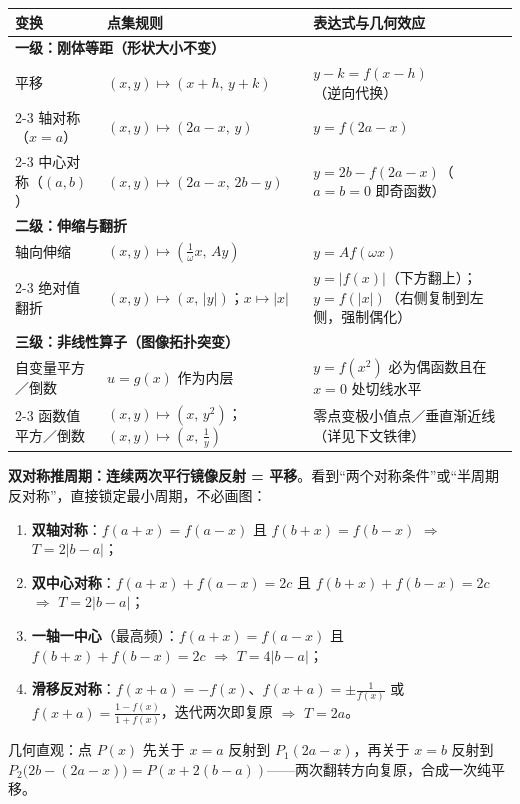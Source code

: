 \begin{explore}
\begin{center}
\renewcommand{\arraystretch}{1.4}
\begin{tabular}{|p{3.2cm}|p{4.0cm}|p{4.8cm}|}
\hline
\textbf{变换} & \textbf{点集规则} & \textbf{表达式与几何效应} \\
\hline
\multicolumn{3}{|l|}{\textbf{一级：刚体等距（形状大小不变）}} \\
\hline
平移 & $(x,y)\mapsto(x+h,\,y+k)$ & $y-k=f(x-h)$（逆向代换） \\
\cline{2-3}
轴对称（$x=a$） & $(x,y)\mapsto(2a-x,\,y)$ & $y=f(2a-x)$ \\
\cline{2-3}
中心对称（$(a,b)$） & $(x,y)\mapsto(2a-x,\,2b-y)$ & $y=2b-f(2a-x)$（$a=b=0$ 即奇函数） \\
\hline
\multicolumn{3}{|l|}{\textbf{二级：伸缩与翻折}} \\
\hline
轴向伸缩 & $(x,y)\mapsto(\frac1\omega x,\,Ay)$ & $y=Af(\omega x)$ \\
\cline{2-3}
绝对值翻折 & $(x,y)\mapsto(x,\,|y|)$；$x\mapsto|x|$ & $y=|f(x)|$（下方翻上）；$y=f(|x|)$（右侧复制到左侧，强制偶化） \\
\hline
\multicolumn{3}{|l|}{\textbf{三级：非线性算子（图像拓扑突变）}} \\
\hline
自变量平方／倒数 & $u=g(x)$ 作为内层 & $y=f(x^2)$ 必为偶函数且在 $x=0$ 处切线水平 \\
\cline{2-3}
函数值平方／倒数 & $(x,y)\mapsto(x,\,y^2)$；$(x,y)\mapsto(x,\,\frac1y)$ & 零点变极小值点／垂直渐近线（详见下文铁律） \\
\hline
\end{tabular}
\end{center}

\begin{method}
\textbf{双对称推周期：连续两次平行镜像反射 = 平移}。看到“两个对称条件”或“半周期反对称”，直接锁定最小周期，不必画图：
\begin{enumerate}
\item \textbf{双轴对称}：$f(a+x)=f(a-x)$ 且 $f(b+x)=f(b-x)$ $\Rightarrow$ $T=2|b-a|$；
\item \textbf{双中心对称}：$f(a+x)+f(a-x)=2c$ 且 $f(b+x)+f(b-x)=2c$ $\Rightarrow$ $T=2|b-a|$；
\item \textbf{一轴一中心}（最高频）：$f(a+x)=f(a-x)$ 且 $f(b+x)+f(b-x)=2c$ $\Rightarrow$ $T=4|b-a|$；
\item \textbf{滑移反对称}：$f(x+a)=-f(x)$、$f(x+a)=\pm\frac1{f(x)}$ 或 $f(x+a)=\frac{1-f(x)}{1+f(x)}$，迭代两次即复原 $\Rightarrow$ $T=2a$。
\end{enumerate}
几何直观：点 $P(x)$ 先关于 $x=a$ 反射到 $P_1(2a-x)$，再关于 $x=b$ 反射到 $P_2\bigl(2b-(2a-x)\bigr)=P(x+2(b-a))$——两次翻转方向复原，合成一次纯平移。
\end{method}


\end{explore}
